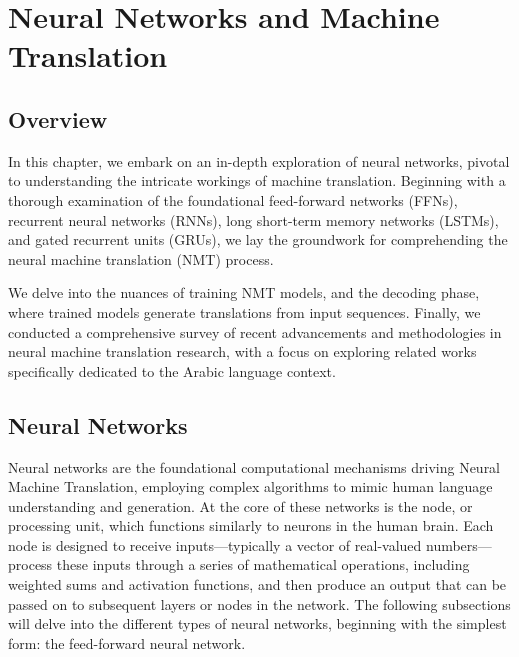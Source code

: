 \chapter{Neural Networks and Machine Translation}
\pagestyle{fancy}
\pagestyle{fancy}\chead{} \pagestyle{fancy}\rhead{}
\pagestyle{fancy} 
\pagestyle{fancy}\cfoot{} \pagestyle{fancy}\rfoot{\thepage}
\section{Overview}\label{start3}
In this chapter, we embark on an in-depth exploration of neural networks, pivotal to understanding the intricate workings of machine translation. 
Beginning with a thorough examination of the foundational feed-forward networks (FFNs), recurrent neural networks (RNNs), long short-term memory networks (LSTMs), and gated recurrent units (GRUs), we lay the groundwork for comprehending the neural machine translation (NMT) process. 

We delve into the nuances of training NMT models, and the decoding phase, where trained models generate translations from input sequences. 
Finally, we conducted a comprehensive survey of recent advancements and methodologies in neural machine translation research, with a focus on exploring related works specifically dedicated to the Arabic language context.

\section{Neural Networks}
Neural networks are the foundational computational mechanisms driving Neural Machine Translation, employing complex algorithms to mimic human language understanding and generation. 
At the core of these networks is the node, or processing unit, which functions similarly to neurons in the human brain. 
Each node is designed to receive inputs—typically a vector of real-valued numbers—process these inputs through a series of mathematical operations, including weighted sums and activation functions, and then produce an output that can be passed on to subsequent layers or nodes in the network.
The following subsections will delve into the different types of neural networks, beginning with the simplest form: the feed-forward neural network.

